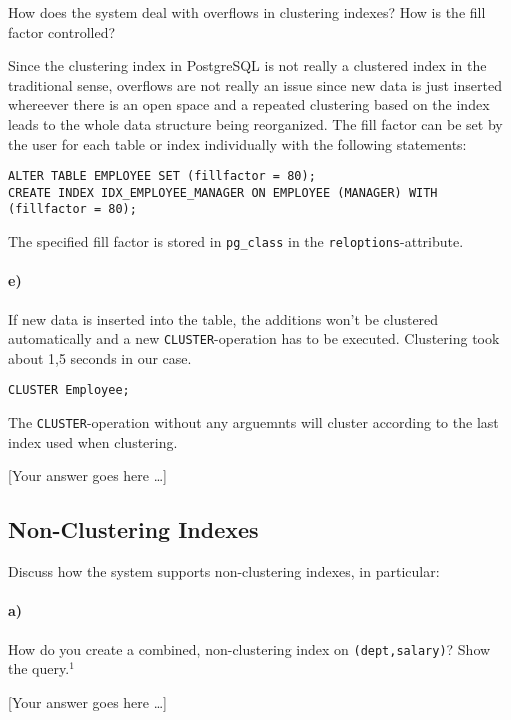\documentclass[11pt]{scrartcl}
\newcommand{\youranswerhere}{[Your answer goes here \ldots]}
\begin{document}
How does the system deal with overflows in clustering indexes? How is the fill factor controlled?

Since the clustering index in PostgreSQL is not really a clustered index in the traditional sense, overflows are not really an issue since new data is just inserted whereever there is an open space and a repeated clustering based on the index leads to the whole data structure being reorganized.
The fill factor can be set by the user for each table or index individually with the following statements:

\begin{lstlisting}[style=dbtsql]
ALTER TABLE EMPLOYEE SET (fillfactor = 80);
CREATE INDEX IDX_EMPLOYEE_MANAGER ON EMPLOYEE (MANAGER) WITH (fillfactor = 80);
\end{lstlisting}

The specified fill factor is stored in \texttt{pg\_class} in the \texttt{reloptions}-attribute.

\paragraph{e)}

If new data is inserted into the table, the additions won't be clustered automatically and a new \texttt{CLUSTER}-operation has to be executed. Clustering took about 1,5 seconds in our case.

\begin{lstlisting}[style=dbtsql]
CLUSTER Employee;
\end{lstlisting}

The \texttt{CLUSTER}-operation without any arguemnts will cluster according to the last index used when clustering.

\youranswerhere{}

\subsection{Non-Clustering Indexes}

Discuss how the system supports non-clustering indexes, in particular:

\paragraph{a)}

How do you create a combined, non-clustering index on \texttt{(dept,salary)}? Show the query.$^1$

\youranswerhere{}
\end{document}
